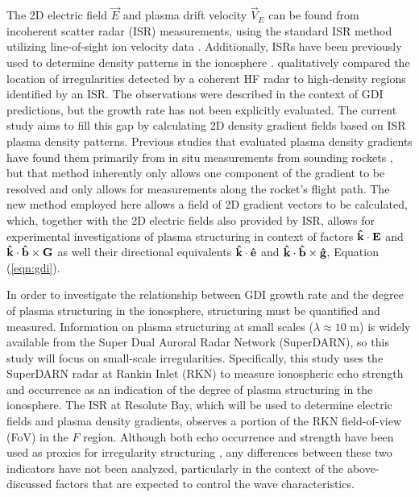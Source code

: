 The 2D electric field \(\vec{E}\)  and plasma drift velocity \(\vec{V}_E\) can be found from incoherent scatter radar (ISR) measurements, using the standard ISR method utilizing line-of-sight ion velocity data \citep{Hei08}.  Additionally, ISRs have been previously used to determine density patterns in the ionosphere \citep{Semeter2009,Dahlgren2012a,Dahlgren2012b}. \citet{Dahlgren2012b} qualitatively compared the location of irregularities detected by a coherent HF radar to high-density regions identified by an ISR.  The observations were described in the context of GDI predictions, but the growth rate has not been explicitly evaluated. The current study aims to fill this gap by calculating 2D density gradient fields based on ISR plasma density patterns. Previous studies that evaluated plasma density gradients have found them primarily from in situ measurements from sounding rockets \citep{Moen2012,Lynch2015}, but that method inherently only allows one component of the gradient to be resolved and only allows for measurements along the rocket's flight path.  The new method employed here allows a field of 2D gradient vectors to be calculated, which, together with the 2D electric fields also provided by ISR, allows for experimental investigations of plasma structuring in context of factors \(\mathbf{\hat{k}}\cdot\mathbf{E}\) and \(\mathbf{\hat{k}}\cdot\mathbf{\hat{b}}\times\mathbf{G}\) as well their directional equivalents \(\mathbf{\hat{k}}\cdot\mathbf{\hat{e}}\) and \(\mathbf{\hat{k}}\cdot\mathbf{\hat{b}}\times\mathbf{\hat{g}}\), Equation (\ref{eqn:gdi}).

In order to investigate the relationship between GDI growth rate and the degree of plasma structuring in the ionosphere, structuring must be quantified and measured.  Information on plasma structuring at small scales (\(\lambda \approx 10\) m) is widely available from the Super Dual Auroral Radar Network (SuperDARN), so this study will focus on small-scale irregularities.  Specifically, this study uses the SuperDARN radar at Rankin Inlet (RKN) to measure ionospheric echo strength and occurrence as an indication of the degree of plasma structuring in the ionosphere. The ISR at Resolute Bay, which will be used to determine electric fields and plasma density gradients, observes a portion of the RKN field-of-view (FoV) in the \(F\) region.  Although both echo occurrence and strength have been used as proxies for irregularity structuring \citep[e.g.][]{Milan2002b,Koustov2012}, any differences between these two indicators have not been analyzed, particularly in the context of the above-discussed factors that are expected to control the wave characteristics.

